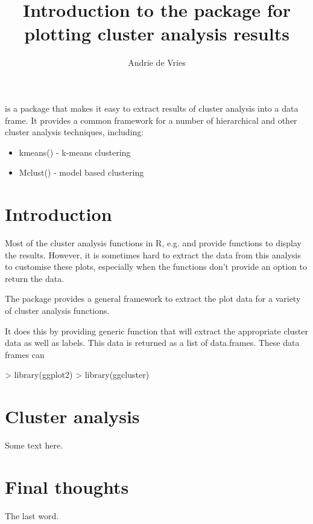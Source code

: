 \documentclass[10pt,oneside]{article}
\begin{document}
\pagestyle{empty}

\setlength{\baselineskip}{1.25em}
\setlength{\parskip}{0.5em}
\setlength{\parindent}{0.0em}

\title{Introduction to the \ggcluster{} package for plotting cluster analysis results}
\author{Andrie de Vries}

\maketitle

\ggcluster{} is a package that makes it easy to extract results of cluster analysis into a data frame.  It provides a common framework for a number of hierarchical and other cluster analysis techniques, including:
\begin{itemize}
\item kmeans() - k-means clustering
\item Mclust() - model based clustering
\end{itemize}

\section{Introduction}

Most of the cluster analysis functions in R, e.g.  and  provide  functions to display the results.  However, it is sometimes hard to extract the data from this analysis to customise these plots, especially when the  functions don't provide an option to return the data.

The \ggluster{} package provides a general framework to extract the plot data for a variety of cluster analysis functions.

It does this by providing generic function \clusterdata{} that will extract the appropriate cluster data as well as labels.  This data is returned as a list of data.frames.  These data frames can 
  
\begin{Schunk}
\begin{Sinput}
> library(ggplot2)
> library(ggcluster)
\end{Sinput}
\end{Schunk}



\section{Cluster analysis}

Some text here.

\section{Final thoughts}

The last word.


\end{document}
